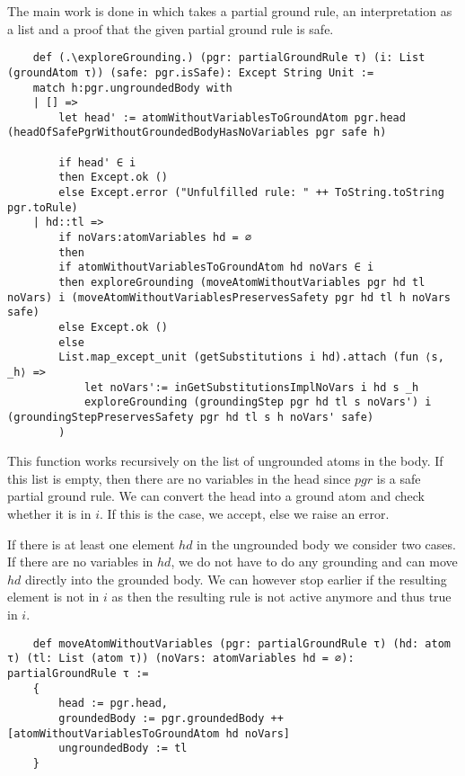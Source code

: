     The main work is done in \exploreGrounding which takes a partial ground rule, an interpretation as a list and a proof that the given partial ground rule is safe.

    \begin{lstlisting}
    def (.\exploreGrounding.) (pgr: partialGroundRule τ) (i: List (groundAtom τ)) (safe: pgr.isSafe): Except String Unit :=
    match h:pgr.ungroundedBody with
    | [] =>
        let head' := atomWithoutVariablesToGroundAtom pgr.head (headOfSafePgrWithoutGroundedBodyHasNoVariables pgr safe h)

        if head' ∈ i
        then Except.ok ()
        else Except.error ("Unfulfilled rule: " ++ ToString.toString pgr.toRule)
    | hd::tl =>
        if noVars:atomVariables hd = ∅
        then
        if atomWithoutVariablesToGroundAtom hd noVars ∈ i
        then exploreGrounding (moveAtomWithoutVariables pgr hd tl noVars) i (moveAtomWithoutVariablesPreservesSafety pgr hd tl h noVars safe)
        else Except.ok ()
        else
        List.map_except_unit (getSubstitutions i hd).attach (fun ⟨s, _h⟩ =>
            let noVars':= inGetSubstitutionsImplNoVars i hd s _h
            exploreGrounding (groundingStep pgr hd tl s noVars') i (groundingStepPreservesSafety pgr hd tl s h noVars' safe)
        )
    \end{lstlisting}

    This function works recursively on the list of ungrounded atoms in the body. If this list is empty, then there are no variables in the head since $pgr$ is a safe partial ground rule. We can convert the head into a ground atom and check whether it is in $i$. If this is the case, we accept, else we raise an error.

    If there is at least one element $hd$ in the ungrounded body we consider two cases. If there are no variables in $hd$, we do not have to do any grounding and can move $hd$ directly into the grounded body. We can however stop earlier if the resulting element is not in $i$ as then the resulting rule is not active anymore and thus true in $i$.

    \begin{lstlisting}
    def moveAtomWithoutVariables (pgr: partialGroundRule τ) (hd: atom τ) (tl: List (atom τ)) (noVars: atomVariables hd = ∅): partialGroundRule τ :=
    {
        head := pgr.head,
        groundedBody := pgr.groundedBody ++ [atomWithoutVariablesToGroundAtom hd noVars]
        ungroundedBody := tl
    }
    \end{lstlisting}

